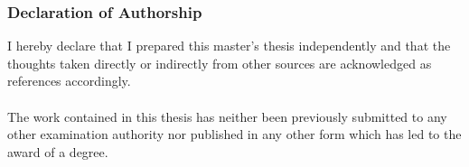 \documentclass[a4paper,11pt,listof=nochaptergap,oneside,pointednumbers,bibtotoc,bigheadings,liststotoc,hidelinks]{scrbook}
\theoremstyle{mysatz}
\theoremstyle{mydefinition}
\theoremstyle{mytheorem}
\theoremstyle{mybemerkung}
\renewcommand*{\paragraph}[1]{\subsubsection*{#1} \vspace{-3mm}} %
\begin{document}



%
%
%
%


\restoregeometry


\nocite{*}
\clearpage
\thispagestyle{empty}







\clearpage
\thispagestyle{empty}
\null\vspace{46pt}
\paragraph{\large{Declaration of Authorship}}
\vspace{43pt}
I hereby declare that I prepared this master's thesis independently and that the thoughts taken
directly or indirectly from other sources are acknowledged as references accordingly. \\
\\
The work contained in this thesis has neither been previously submitted to any other examination authority nor published in any other form which has led to the award of a degree.\\[10mm]
\end{document}
